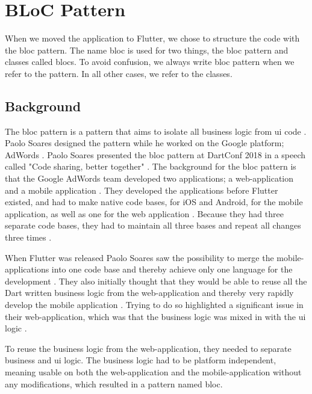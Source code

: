 \section{BLoC Pattern}

When we moved the application to Flutter, we chose to structure the code with the \gls{bloc} pattern. The name \gls{bloc} is used for two things, the \gls{bloc} pattern and classes called \glspl{bloc}. To avoid confusion, we always write \gls{bloc} pattern when we refer to the pattern. In all other cases, we refer to the classes.

\subsection{Background}
The \gls{bloc} pattern is a pattern that aims to isolate all business logic from \gls{ui} code \cite{blocPattern}. Paolo Soares designed the pattern while he worked on the Google platform; AdWords \cite[30 sec]{blocPattern}. Paolo Soares presented the \gls{bloc} pattern at DartConf 2018 in a speech called "Code sharing, better together" \cite{blocPattern}.
The background for the \gls{bloc} pattern is that the Google AdWords team developed two applications; a web-application and a mobile application \cite[30 sec]{blocPattern}.
They developed the applications before Flutter existed, and had to make native code bases, for iOS and Android, for the mobile application, as well as one for the web application \cite[30 sec]{blocPattern}.
Because they had three separate code bases, they had to maintain all three bases and repeat all changes three times \cite[30 sec]{blocPattern}.

When Flutter was released Paolo Soares saw the possibility to merge the mobile-applications into one code base and thereby achieve only one language for the development \cite[1 min 15 sec]{blocPattern}. They also initially thought that they would be able to reuse all the Dart written business logic from the web-application and thereby very rapidly develop the mobile application \cite[1 min 48 sec]{blocPattern}. Trying to do so highlighted a significant issue in their web-application, which was that the business logic was mixed in with the \gls{ui} logic \cite[2 min 12 sec]{blocPattern}.

To reuse the business logic from the web-application, they needed to separate business and \gls{ui} logic. The business logic had to be platform independent, meaning usable on both the web-application and the mobile-application without any modifications\cite[2 min 12 sec]{blocPattern}, which resulted in a pattern named \gls{bloc}.

